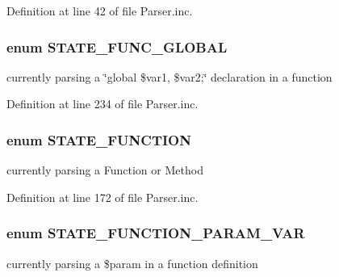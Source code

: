 \-Definition at line 42 of file \-Parser.\-inc.

\hypertarget{_parser_8inc_a333f78fef8bf632f9555525c947b4144}{
\subsubsection[{\-S\-T\-A\-T\-E\-\_\-\-F\-U\-N\-C\-\_\-\-G\-L\-O\-B\-A\-L}]{\setlength{\rightskip}{0pt plus 5cm}enum {\bf \-S\-T\-A\-T\-E\-\_\-\-F\-U\-N\-C\-\_\-\-G\-L\-O\-B\-A\-L}}}\label{_parser_8inc_a333f78fef8bf632f9555525c947b4144}
currently parsing a \char`\"{}global \$var1, \$var2;\char`\"{} declaration in a function 

\-Definition at line 234 of file \-Parser.\-inc.

\hypertarget{_parser_8inc_ad400f7a5b6c53bdd37bd9ccfe4dd7c9f}{
\subsubsection[{\-S\-T\-A\-T\-E\-\_\-\-F\-U\-N\-C\-T\-I\-O\-N}]{\setlength{\rightskip}{0pt plus 5cm}enum {\bf \-S\-T\-A\-T\-E\-\_\-\-F\-U\-N\-C\-T\-I\-O\-N}}}\label{_parser_8inc_ad400f7a5b6c53bdd37bd9ccfe4dd7c9f}
currently parsing a \-Function or \-Method 

\-Definition at line 172 of file \-Parser.\-inc.

\hypertarget{_parser_8inc_ab5b4aedbc4993b460054ac8c9bd99171}{
\subsubsection[{\-S\-T\-A\-T\-E\-\_\-\-F\-U\-N\-C\-T\-I\-O\-N\-\_\-\-P\-A\-R\-A\-M\-\_\-\-V\-A\-R}]{\setlength{\rightskip}{0pt plus 5cm}enum {\bf \-S\-T\-A\-T\-E\-\_\-\-F\-U\-N\-C\-T\-I\-O\-N\-\_\-\-P\-A\-R\-A\-M\-\_\-\-V\-A\-R}}}\label{_parser_8inc_ab5b4aedbc4993b460054ac8c9bd99171}
currently parsing a \$param in a function definition 

